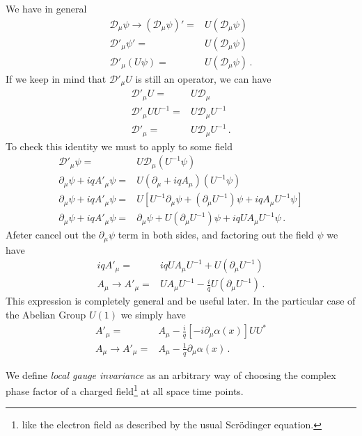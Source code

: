 We have in general
\begin{align}
     \mathcal{D}_\mu \psi\to\left(\mathcal{D}_\mu \psi\right)'=&U\left(\mathcal{D}_\mu \psi\right)\nonumber\\
    \mathcal{D}'_\mu \psi'=&U\left(\mathcal{D}_\mu \psi\right)\nonumber\\
    \mathcal{D}'_\mu \left( U\psi \right)=&U\left(\mathcal{D}_\mu \psi\right)\,.
\end{align}
If we keep in mind that $\mathcal{D}'_\mu U$ is still an operator, we can have
\begin{align}
    \mathcal{D}'_\mu U=&U\mathcal{D}_\mu \nonumber\\
    \mathcal{D}'_\mu UU^{-1}=&U\mathcal{D}_\mu U^{-1} \nonumber\\
    \mathcal{D}'_\mu =&U\mathcal{D}_\mu U^{-1} \,.
\end{align}
To check this identity we must to apply to some field
\begin{align*}
    \mathcal{D}'_\mu \psi =&U\mathcal{D}_\mu \left(U^{-1}\psi  \right) \nonumber\\
    \partial_{\mu}\psi+iq A'_{\mu} \psi =&U \left(\partial_{\mu}+iq A_{\mu}  \right) \left(U^{-1}\psi  \right) \nonumber\\
    \partial_{\mu}\psi+iq A'_{\mu} \psi =&U \left[U^{-1}\partial_{\mu}\psi+\left( \partial_{\mu}U^{-1} \right)\psi+iq  A_{\mu}U^{-1}\psi\right] \nonumber\\
    \partial_{\mu}\psi+iq A'_{\mu} \psi =&\partial_{\mu}\psi+U\left( \partial_{\mu}U^{-1} \right)\psi+iq  U A_{\mu}U^{-1}\psi\,.
\end{align*}
Afeter cancel out the $\partial_{\mu}\psi$ term in both sides, and factoring out the field $\psi$ we have
\begin{align}
      iq A'_{\mu} =&iq  U A_{\mu}U^{-1}+ U\left( \partial_{\mu}U^{-1} \right)\nonumber\\
      A_{\mu}\to A'_{\mu} =&U A_{\mu}U^{-1}-\frac{i}{q}U\left( \partial_{\mu}U^{-1} \right)\,.
\end{align}
This expression is completely general and be useful later. In the particular case of the Abelian Group $U(1)$ we simply have
\begin{align}
  A'_{\mu}=&A_{\mu}-\frac{i}{q}\left[ -i\partial_{\mu}\alpha(x) \right]UU^{*}\nonumber\\
 A_{\mu}\to  A'_{\mu}=&A_{\mu}-\frac{1}{q}\partial_{\mu}\alpha(x)\,.
\end{align}


We define \emph{local gauge invariance} as an arbitrary way of choosing the complex phase factor of a charged field\footnote{like the electron field as described by the usual Scrödinger equation.} at all space time points.

